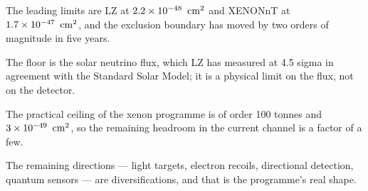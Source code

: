 \begin{keytakeaways}
\item The leading limits are LZ at $2.2\times 10^{-48}\ \,\mathrm{cm}^{2}$ and
XENONnT at $1.7\times 10^{-47}\ \,\mathrm{cm}^{2}$, and the exclusion boundary has
moved by two orders of magnitude in five years.
\item The floor is the solar neutrino flux, which LZ has measured at 4.5
sigma in agreement with the Standard Solar Model; it is a physical limit on
the flux, not on the detector.
\item The practical ceiling of the xenon programme is of order 100 tonnes
and $3\times 10^{-49}\ \,\mathrm{cm}^{2}$, so the remaining headroom in the current
channel is a factor of a few.
\item The remaining directions --- light targets, electron recoils,
directional detection, quantum sensors --- are diversifications, and that
is the programme's real shape.
\end{keytakeaways}
